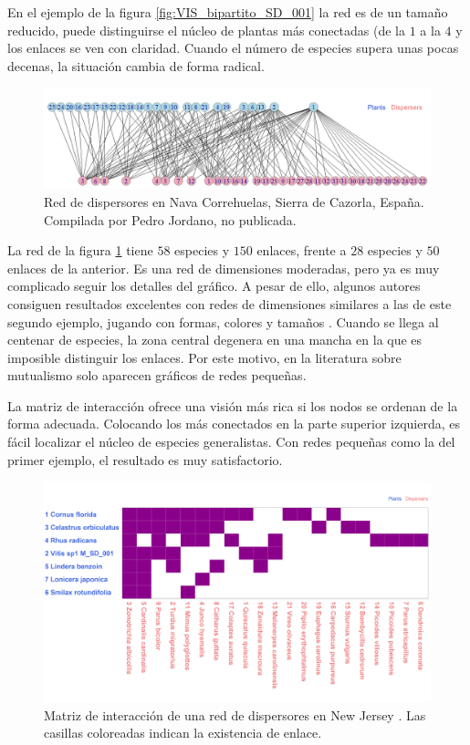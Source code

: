 En el ejemplo de la figura \ref{fig:VIS_bipartito_SD_001} la red es de un tamaño reducido, puede distinguirse el núcleo de plantas más conectadas (de la $1$ a la $4$ y los enlaces se ven con claridad. Cuando el número de especies supera unas pocas decenas, la situación cambia de forma radical.

\begin{figure}[h!]
\centering
\includegraphics[scale=0.4]{Figures/VIS_bipartito_SD_020.png}
\caption{Red de dispersores en Nava Correhuelas, Sierra de Cazorla, España. Compilada por Pedro Jordano, no publicada.}
\label{fig:VIS_bipartito_SD_020}
\end{figure}

La red de la figura \ref{fig:VIS_bipartito_SD_020} tiene $58$ especies y $150$ enlaces, frente a $28$ especies y $50$ enlaces de la anterior. Es una red de dimensiones moderadas, pero ya es muy complicado seguir los detalles del gráfico. A pesar de ello, algunos autores consiguen resultados excelentes con redes de dimensiones similares a las de este segundo ejemplo, jugando con formas, colores y tamaños \cite{dakos2014critical}. Cuando se llega al centenar de especies, la zona central degenera en una mancha en la que es imposible distinguir los enlaces. Por este motivo, en la literatura sobre mutualismo solo aparecen gráficos de redes pequeñas. 

La matriz de interacción ofrece una visión más rica si los nodos se ordenan de la forma adecuada. Colocando los más conectados en la parte superior izquierda, es fácil localizar el núcleo de especies generalistas. Con redes pequeñas como la del primer ejemplo, el resultado es muy satisfactorio.

\begin{figure}[h!]
\centering
\includegraphics[scale=0.4]{Figures/VIS_matrix_SD_001.png}
\caption{Matriz de interacción de una red de dispersores en New Jersey \cite{baird1980selection}. Las casillas coloreadas indican la existencia de enlace.}
\label{fig:VIS_matrix_SD_001}
\end{figure}

